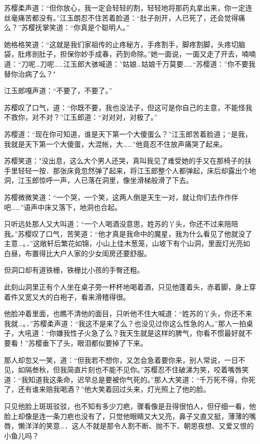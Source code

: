 \documentclass[12pt,oneside]{book}
\begin{document}
苏樱柔声道：``但你放心，我一定会轻轻的割，轻轻地将那药丸拿出来，你一定连丝毫痛苦都没有。''江玉朗忍不住苦着脸道：``肚子剖开，人已死了，还会觉得痛么？''苏樱抚掌笑道：``你真是个聪明人。''

她格格笑道：``这就是我们家祖传的止疼秘方，手疼割手，脚疼割脚，头疼切脑袋，肚疼剖肚子，担保你妙手成春，药到命除。''她一面说，一面又走了开去，喃喃道：``刀呢\ldots 刀呢\ldots\ldots 江玉郎大骇喊道：''姑娘\ldots 姑娘千万莫要\ldots\ldots{}``苏樱道：''你不要我替你治病了么？"

江玉郎嘎声道：``不要了，不要了。''

苏樱叹了口气，道：``你既不要，我也没法子，但这可是你自己的主意，不能怪我不救你，对不对？''江玉郎道：``对对对，对极了。''

苏樱道：``现在你可知道，谁是天下第一个大傻蛋么？''江玉郎苦着脸道；``是我，我就是天下第一个大傻蛋，大混帐，大\ldots\ldots{}''他竟忍不住放声痛哭了起来。

苏樱笑道："没出息，这么大个男人还哭，真叫我见了难受她的手又在那椅子的扶手里轻轻一按．那张床竟忽然弹了起来，将江玉郎整个人都弹起，床后却露出个地洞，江玉郎惊呼一声，人已落在洞里，像坐滑梯般滑了下去。

苏樱微微笑道：``一个哭，一个笑，这两人倒是天生一对，就让你们去作作伴吧\ldots\ldots{}''语声中床又落下，地洞也合起。

只听远处那人又大叫道：``一个人喝酒没意思，姓苏的丫头，你还不过来陪陪我。''苏樱叹了口气，苦笑道：``他才真是我命中的魔星，我为什么看见了他就没了主意\ldots。．''这敞轩后繁花如锦，小山上佳木葱笼，山坡下有个山洞，里面灯光亮如白昼，布置得比大户人家的少女闺房还要舒服。

但洞口却有道铁栅，铁栅比小孩的手臀还粗。

此刻山洞里正有个人坐在桌子旁一杯杯地喝着酒，只见他蓬着头，赤着脚，身上穿着件又宽又大的白袍子，看来滑稽得很。

他脸冲着里面，也瞧不清他的面目，只听他不住大喊道：``姓苏的丫头，你还不来我就\ldots。．''苏樱柔声道：``我这不是来了么？也没见过你这么性急的人。''那人一拍桌子，大吼道：``你嫌我性子火急了么？我天生就是这样的脾气，你看不惯最好就不要看！''苏樱垂下了头，眼泪都似要掉了下来。

那人却忽又一笑，道：``但我若不想你，又怎会急着要你来，别人常说，一日不见，如隔叁秋，但我简直片刻也不能不见你。''苏樱忍不住破涕为笑，咬着嘴唇笑道：``我知道我这条命，迟早总是要被你气死的。''那人大笑道：``千万死不得，你死了，还有谁来赔我喝酒？''他大笑着回过头来，灯光照上了他的脸。

只见他脸上斑斑驳驳，也不知有多少刀疤，骤看像是丑得很怕人，但仔细一看，他脸上却像是连一条刀疤也没有了，只觉他眼睛又大又亮，鼻子又直又挺，薄薄的嘴唇，懒洋洋的笑意\ldots．这人不就是那令人割不断、抛不下、朝思夜想、又爱又恨的小鱼儿吗？
\end{document}

